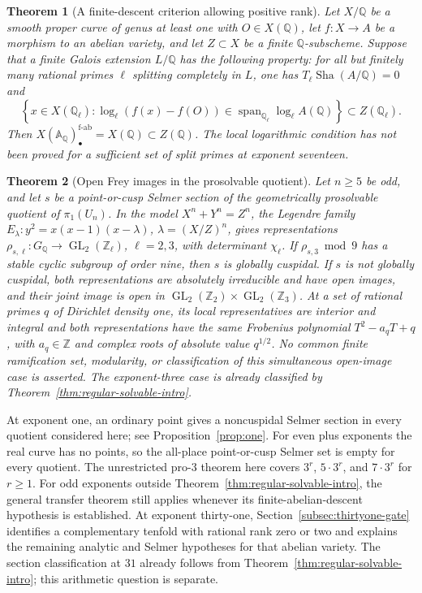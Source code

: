 \documentclass[11pt]{article}
\newcommand{\Q}{\mathbb Q}
\newcommand{\Z}{\mathbb Z}
\numberwithin{equation}{section}
\newcommand{\A}{\mathbb A}
\newcommand{\Sha}{\operatorname{Sha}}
\newtheorem{theorem}{Theorem}[section]
\theoremstyle{definition}
\begin{document}
\begin{theorem}[A finite-descent criterion allowing positive rank]
\label{thm:positive-rank-split-intro}
Let $X/\Q$ be a smooth proper curve of genus at least one with
$O\in X(\Q)$, let $f:X\to A$ be a morphism to an abelian variety,
and let $Z\subset X$ be a finite $\Q$-subscheme. Suppose that a
finite Galois extension $L/\Q$ has the following property: for all
but finitely many rational primes $\ell$ splitting completely in
$L$, one has $T_\ell\Sha(A/\Q)=0$ and
\[
 \left\{x\in X(\Q_\ell):
 \log_\ell(f(x)-f(O))\in
 \operatorname{span}_{\Q_\ell}\log_\ell A(\Q)\right\}
       \subset Z(\Q_\ell).
\]
Then $X(\A_\Q)_\bullet^{\mathrm{f\text{-}ab}}=X(\Q)\subset Z(\Q)$.
The local logarithmic condition has not been proved for a
sufficient set of split primes at exponent seventeen.
\end{theorem}


\begin{theorem}[Open Frey images in the prosolvable quotient]
\label{thm:prosolvable-frey-open-intro}
Let $n\ge5$ be odd, and let $s$ be a point-or-cusp Selmer section
of the geometrically prosolvable quotient of $\pi_1(U_n)$.
In the model $X^n+Y^n=Z^n$, the Legendre family
$E_\lambda:y^2=x(x-1)(x-\lambda)$, $\lambda=(X/Z)^n$,
gives representations
$\rho_{s,\ell}:G_\Q\to\operatorname{GL}_2(\Z_\ell)$,
$\ell=2,3$, with determinant $\chi_\ell$.
If $\rho_{s,3}\bmod9$ has a stable cyclic subgroup of order nine,
then $s$ is globally cuspidal.
If $s$ is not globally cuspidal, both representations are absolutely
irreducible and have open images, and their joint image is open in
$\operatorname{GL}_2(\Z_2)\times\operatorname{GL}_2(\Z_3)$.
At a set of rational primes $q$ of Dirichlet density one, its local
representatives are interior and integral and both representations
have the same Frobenius polynomial $T^2-a_qT+q$, with $a_q\in\Z$
and complex roots of absolute value $q^{1/2}$.
No common finite ramification set, modularity, or classification of
this simultaneous open-image case is asserted. The exponent-three
case is already classified by Theorem~\ref{thm:regular-solvable-intro}.
\end{theorem}

At exponent one, an ordinary point gives a noncuspidal Selmer section
in every quotient considered here; see Proposition~\ref{prop:one}.
For even plus exponents the real curve has no points, so the all-place
point-or-cusp Selmer set is empty for every quotient. The unrestricted
pro-$3$ theorem here covers $3^r$, $5\cdot3^r$, and $7\cdot3^r$ for $r\ge1$.
For odd exponents
outside Theorem~\ref{thm:regular-solvable-intro}, the general transfer theorem still
applies whenever its finite-abelian-descent hypothesis is established.
At exponent thirty-one, Section~\ref{subsec:thirtyone-gate} identifies a
complementary tenfold with rational rank zero or two and explains the
remaining analytic and Selmer hypotheses for that abelian variety.
The section classification at \(31\) already follows from
Theorem~\ref{thm:regular-solvable-intro}; this arithmetic question
is separate.
\end{document}
